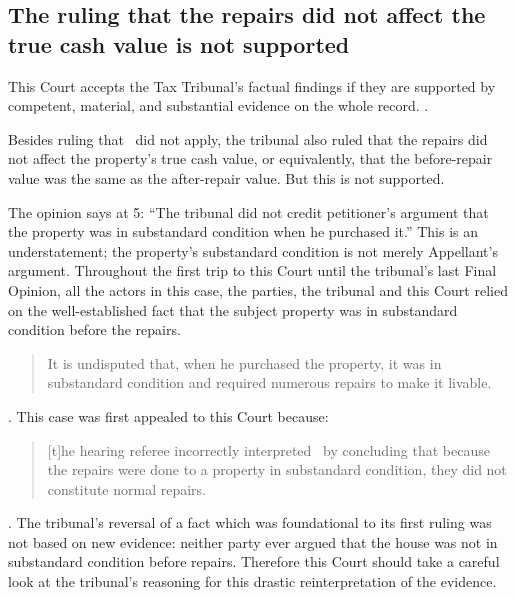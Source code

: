 \documentclass[12pt,\documentclassflag]{michiganCourtOfAppealsBrief}
\begin{document}
\subsection{The ruling that the repairs did not affect the true cash value is not supported}

This Court accepts the Tax Tribunal's factual findings if they are supported by competent, material, and substantial evidence on the whole record. . 

Besides ruling that \mathieuGast\ did not apply, %
the tribunal also ruled that the repairs did not affect the property's true cash value, or equivalently, that the before-repair value was the same as the after-repair value. But this is not supported.

The opinion says at 5: ``The
tribunal did not credit petitioner's argument that the property was in substandard condition when
he purchased it.'' This is an understatement; the property's substandard condition is not merely Appellant's argument. Throughout the first trip to this Court until the tribunal's last Final Opinion, all the actors in this case, the parties, the tribunal and this Court relied on the well-established fact that the subject property was in substandard condition before the repairs.

\begin{quote}
  It is undisputed that, when he purchased the property, it was in substandard condition and required numerous repairs to make it livable.
\end{quote}
.
This case was first appealed to this Court because:

\begin{quote}
  [t]he hearing referee incorrectly interpreted \mathieuGast\ by concluding that because the repairs were done to a property in substandard condition, they did not constitute normal repairs.
\end{quote}
. 
The tribunal's reversal of a fact which was foundational to its first ruling was not based on new evidence: neither party ever argued that the house was not in substandard condition before repairs. Therefore this Court should take a careful look at the tribunal's reasoning for this drastic reinterpretation of the evidence.
\end{document}
